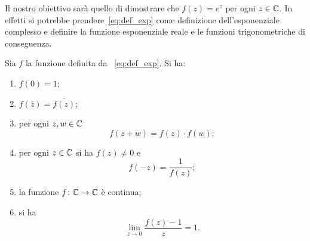 Il nostro obiettivo sarà quello di dimostrare che $f(z)=e^z$ per ogni $z\in {\mathbb C}$.
In effetti si potrebbe prendere~\ref{eq:def_exp} come definizione 
dell'esponenziale complesso e definire la funzione esponenziale 
reale e le funzioni trigonometriche di conseguenza.

\begin{theorem}
\label{th:exp_complesso}%
Sia $f$ la funzione definita da ~\eqref{eq:def_exp}.
Si ha:
\begin{enumerate}
\item
$\displaystyle f(0) = 1$;

\item
$\displaystyle f(\bar z) = \overline{f(z)}$;

\item
per ogni $z,w \in {\mathbb C}$
\[
  f(z+w) = f(z) \cdot f(w);
\]

\item
per ogni $z\in {\mathbb C}$ si ha $f(z) \neq 0$ e
\[
 f(-z) = \frac{1}{f(z)};
\]

\item la funzione $f\colon {\mathbb C} \to {\mathbb C}$ è continua;

\item si ha
\begin{equation}\label{eq:limite_exp_complesso}
   \lim_{z\to 0}\frac{f(z)-1}{z} = 1.
\end{equation}
\end{enumerate}
\end{theorem}
%

